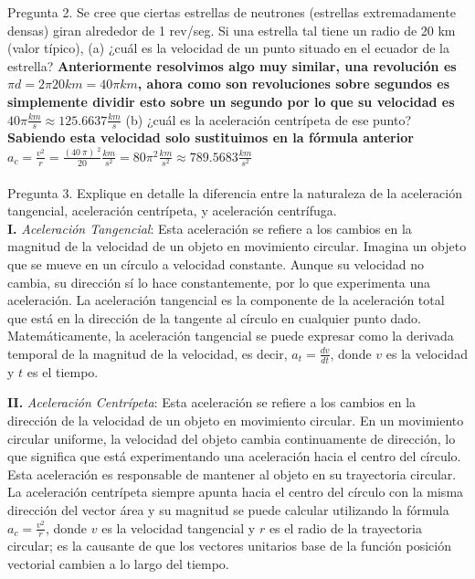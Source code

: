 \documentclass{article}
\begin{document}
Pregunta 2. Se cree que ciertas estrellas de neutrones (estrellas extremadamente densas)
giran alrededor de 1 rev/seg. Si una estrella tal tiene un radio de 20 km (valor típico), (a) ¿cuál es la velocidad de un punto situado en el ecuador de la estrella? \textbf{Anteriormente resolvimos algo muy similar, una revolución es $\pi d = 2 \pi 20km = 40 \pi km$, ahora como son revoluciones sobre segundos es simplemente dividir esto sobre un segundo por lo que su velocidad es $40 \pi \frac{km}{s} \approx 125.6637 \frac{km}{s}$} (b) ¿cuál es la aceleración centrípeta de ese punto? \textbf{Sabiendo esta velocidad solo sustituimos en la fórmula anterior $a_c = \frac{v^2}{r} = \frac{\left(40\:\pi \right)\:^2}{20} \frac{km}{s^2} = 80 \pi^2 \frac{km}{s^2} \approx 789.5683 \frac{km}{s^2}$}\\\\
Pregunta 3. Explique en detalle la diferencia entre la naturaleza de la aceleración tangencial, aceleración centrípeta, y aceleración centrífuga.\\
\textbf{I.} \textit{Aceleración Tangencial}: Esta aceleración se refiere a los cambios en la magnitud de la velocidad de un objeto en movimiento circular. Imagina un objeto que se mueve en un círculo a velocidad constante. Aunque su velocidad no cambia, su dirección sí lo hace constantemente, por lo que experimenta una aceleración. La aceleración tangencial es la componente de la aceleración total que está en la dirección de la tangente al círculo en cualquier punto dado. Matemáticamente, la aceleración tangencial se puede expresar como la derivada temporal de la magnitud de la velocidad, es decir, $a_t = \frac{dv}{dt}$, donde $v$ es la velocidad y $t$ es el tiempo.

\noindent \textbf{II.} \textit{Aceleración Centrípeta}: Esta aceleración se refiere a los cambios en la dirección de la velocidad de un objeto en movimiento circular. En un movimiento circular uniforme, la velocidad del objeto cambia continuamente de dirección, lo que significa que está experimentando una aceleración hacia el centro del círculo. Esta aceleración es responsable de mantener al objeto en su trayectoria circular. La aceleración centrípeta siempre apunta hacia el centro del círculo con la misma dirección del vector área y su magnitud se puede calcular utilizando la fórmula $a_c = \frac{v^2}{r}$, donde $v$ es la velocidad tangencial y $r$ es el radio de la trayectoria circular; es la causante de que los vectores unitarios base de la función posición vectorial cambien a lo largo del tiempo.
\end{document}
